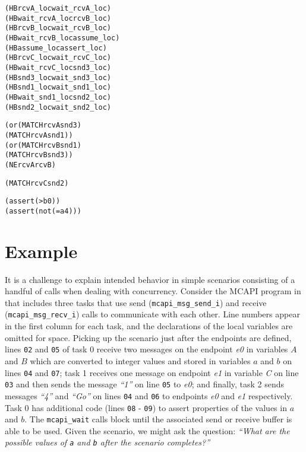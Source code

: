 \newsavebox{\boxSMT}
\begin{lrbox}{\boxSMT}
\begin{minipage}[c]{0.4\linewidth}
\begin{alltt}
(HB rcvA_loc wait_rcvA_loc)
(HB wait_rcvA_loc rcvB_loc)
(HB rcvB_loc wait_rcvB_loc)
(HB wait_rcvB_loc assume_loc)
(HB assume_loc assert_loc)
(HB rcvC_loc wait_rcvC_loc)
(HB wait_rcvC_loc snd3_loc)
(HB snd3_loc wait_snd3_loc)
(HB snd1_loc wait_snd1_loc)
(HB wait_snd1_loc snd2_loc)
(HB snd2_loc wait_snd2_loc)

(or (MATCH rcvA snd3)
    (MATCH rcvA snd1))
(or (MATCH rcvB  snd1)
    (MATCH rcvB snd3))
(NE rcvA rcvB)

(MATCH rcvC snd2)

(assert (> b 0))
(assert (not (= a 4)))
\end{alltt}
\end{minipage}
\end{lrbox}

\section{Example}

It is a challenge to explain intended behavior in simple scenarios
consisting of a handful of calls when dealing with concurrency. Consider
the MCAPI program in  that includes three
tasks that use send (\texttt{mcapi\_msg\_send\_i}) and receive
(\texttt{mcapi\_msg\_recv\_i}) calls to communicate with each other.
Line numbers appear in the first column for each task, and the
declarations of the local variables are omitted for space. Picking up
the scenario just after the endpoints are defined, lines \texttt{02}
and \texttt{05} of task 0 receive two messages on the endpoint
\textit{e0} in variables $A$ and $B$ which are
converted to integer values and stored in variables $a$ and
$b$ on lines \texttt{04} and \texttt{07}; task 1 receives one
message on endpoint \textit{e1} in variable \textit{C} on line
\texttt{03} and then sends the message \textit{``1''} on line \texttt{05} to
\textit{e0}; and finally, task 2 sends messages \textit{``4''} and \textit{``Go''} on
lines \texttt{04} and \texttt{06} to endpoints \textit{e0} and
\textit{e1} respectively. Task 0 has additional code (lines \texttt{08} -
\texttt{09}) to assert properties of the values in $a$ and
$b$. The \texttt{mcapi\_wait} calls block until the associated
send or receive buffer is able to be used. Given the scenario, we
might ask the question: \emph{``What are the possible values of
\texttt{a} and \texttt{b} after the scenario completes?''}





